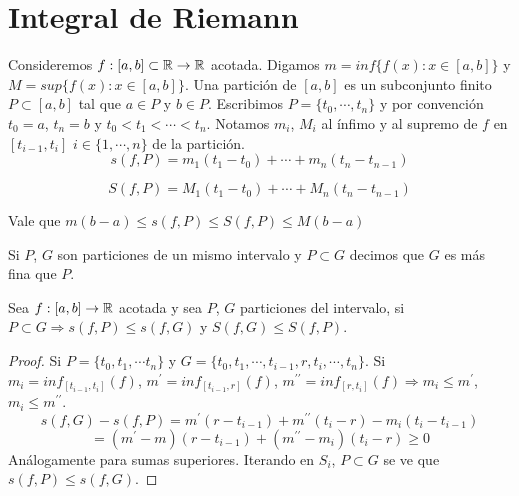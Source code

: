 \section{Integral de Riemann}

Consideremos $f: [a, b] \subset \mathbb{R} \to \mathbb{R}$ acotada. Digamos $m = inf\{ f(x) : x \in [a,b] \}$ y $M = sup \{ f(x) : x \in [a, b] \}$.
Una partición de $[a, b]$ es un subconjunto finito $P \subset [a, b]$ tal que $a \in P$ y $b \in P$.
Escribimos $P = \{ t_0, \cdots, t_n \}$ y por convención $t_0 = a$, $t_n = b$ y $t_0 < t_1 < \cdots < t_n$.
Notamos $m_i$, $M_i$ al ínfimo y al supremo de $f$ en $[t_{i-1}, t_i]$ $i \in \{ 1, \cdots, n \}$ de la partición.
\begin{equation}
  s(f, P) = m_1 (t_1 - t_0) + \cdots + m_n (t_n - t_{n-1})
\end{equation}

\begin{equation}
  S(f, P) = M_1 (t_1 - t_0) + \cdots + M_n (t_n - t_{n-1})
\end{equation}

Vale que $m (b-a) \leq s(f, P) \leq S(f, P) \leq M (b-a)$

\begin{definition}
  Si $P$, $G$ son particiones de un mismo intervalo y $P \subset G$ decimos que $G$ es más fina que $P$.
\end{definition}

\begin{lemma}
  Sea $f: [a, b] \to \mathbb{R}$ acotada y sea $P$, $G$ particiones del intervalo, si $P \subset G \Rightarrow s(f, P) \leq s(f, G)$ y $S(f, G) \leq S(f, P)$.
  \begin{proof}
    Si $P = \{ t_0, t_1, \cdots t_n \}$ y $G = \{ t_0, t_1, \cdots, t_{i-1}, r, t_i, \cdots, t_n \}$. Si $m_i = inf_{[t_{i-1}, t_i]}(f)$, $m^{\prime} = inf_{[t_{i-1}, r]}(f)$, $m^{\prime \prime} = inf_{[r, t_i]}(f) \Rightarrow m_i \leq m^{\prime}$, $m_i \leq m^{\prime \prime}$. \begin{equation}
      s(f, G) - s(f, P) = m^{\prime} (r - t_{i-1}) + m^{\prime \prime} (t_i - r) - m_i (t_i - t_{i-1})
    \end{equation}
    \begin{equation}
      = (m^{\prime} - m)(r - t_{i-1}) + (m^{\prime \prime} - m_i) (t_i - r) \geq 0
    \end{equation}
    Análogamente para sumas superiores. Iterando en $S_i$, $P \subset G$ se ve que $s(f, P) \leq s(f, G)$.
  \end{proof}
\end{lemma}

